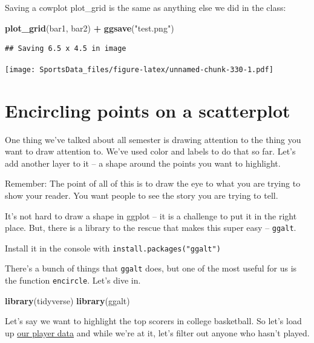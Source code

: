 \documentclass[]{book}
\newenvironment{Shaded}{\begin{snugshade}}{\end{snugshade}}
\newcommand{\KeywordTok}[1]{\textcolor[rgb]{0.13,0.29,0.53}{\textbf{#1}}}
\newcommand{\NormalTok}[1]{#1}
\newcommand{\OperatorTok}[1]{\textcolor[rgb]{0.81,0.36,0.00}{\textbf{#1}}}
\newcommand{\StringTok}[1]{\textcolor[rgb]{0.31,0.60,0.02}{#1}}
\begin{document}
Saving a cowplot plot\_grid is the same as anything else we did in the class:

\begin{Shaded}
\begin{Highlighting}[]
\KeywordTok{plot_grid}\NormalTok{(bar1, bar2) }\OperatorTok{+}\StringTok{ }\KeywordTok{ggsave}\NormalTok{(}\StringTok{"test.png"}\NormalTok{)}
\end{Highlighting}
\end{Shaded}

\begin{verbatim}
## Saving 6.5 x 4.5 in image
\end{verbatim}

\texttt{[image: SportsData\_files/figure-latex/unnamed-chunk-330-1.pdf]}

\hypertarget{encircling-points-on-a-scatterplot}{%
\chapter{Encircling points on a scatterplot}\label{encircling-points-on-a-scatterplot}}

One thing we've talked about all semester is drawing attention to the thing you want to draw attention to. We've used color and labels to do that so far. Let's add another layer to it -- a shape around the points you want to highlight.

Remember: The point of all of this is to draw the eye to what you are trying to show your reader. You want people to see the story you are trying to tell.

It's not hard to draw a shape in ggplot -- it is a challenge to put it in the right place. But, there is a library to the rescue that makes this super easy -- \texttt{ggalt}.

Install it in the console with \texttt{install.packages("ggalt")}

There's a bunch of things that \texttt{ggalt} does, but one of the most useful for us is the function \texttt{encircle}. Let's dive in.

\begin{Shaded}
\begin{Highlighting}[]
\KeywordTok{library}\NormalTok{(tidyverse)}
\KeywordTok{library}\NormalTok{(ggalt)}
\end{Highlighting}
\end{Shaded}

Let's say we want to highlight the top scorers in college basketball. So let's load up \href{https://unl.box.com/s/0g56ve61y6hakyxzr1u4t534721bqvg8}{our player data} and while we're at it, let's filter out anyone who hasn't played.
\end{document}
